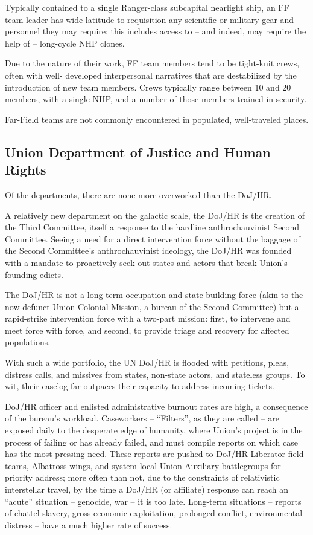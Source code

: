 Typically contained to a single Ranger-class subcapital nearlight ship, an FF team leader has
wide latitude to requisition any scientific or military gear and personnel they may require; this
includes access to -- and indeed, may require the help of -- long-cycle NHP clones.

Due to the nature of their work, FF team members tend to be tight-knit crews, often with well-
developed interpersonal narratives that are destabilized by the introduction of new team
members. Crews typically range between 10 and 20 members, with a single NHP, and a number
of those members trained in security.

Far-Field teams are not commonly encountered in populated, well-traveled places.

\subsection{Union Department of Justice and Human Rights}

Of the departments, there are none more overworked than the DoJ/HR.

A relatively new department on the galactic scale, the DoJ/HR is the creation of the Third
Committee, itself a response to the hardline anthrochauvinist Second Committee. Seeing a need
for a direct intervention force without the baggage of the Second Committee's anthrochauvinist
ideology, the DoJ/HR was founded with a mandate to proactively seek out states and actors that
break Union's founding edicts.

The DoJ/HR is not a long-term occupation and state-building force (akin to the now defunct Union
Colonial Mission, a bureau of the Second Committee) but a rapid-strike intervention force with a
two-part mission: first, to intervene and meet force with force, and second, to provide triage and
recovery for affected populations.

With such a wide portfolio, the UN DoJ/HR is flooded with petitions, pleas, distress calls, and
missives from states, non-state actors, and stateless groups. To wit, their caselog far outpaces
their capacity to address incoming tickets.

DoJ/HR officer and enlisted administrative burnout rates are high, a consequence of the bureau's
workload. Caseworkers -- ``Filters'', as they are called -- are exposed daily to the desperate edge
of humanity, where Union's project is in the process of failing or has already failed, and must
compile reports on which case has the most pressing need. These reports are pushed to DoJ/HR
Liberator field teams, Albatross wings, and system-local Union Auxiliary battlegroups for priority
address; more often than not, due to the constraints of relativistic interstellar travel, by the time a
DoJ/HR (or affiliate) response can reach an ``acute'' situation -- genocide, war -- it is too late.
Long-term situations -- reports of chattel slavery, gross economic exploitation, prolonged conflict,
environmental distress -- have a much higher rate of success.

